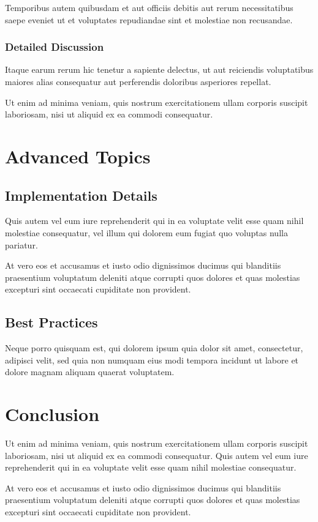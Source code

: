\documentclass[11pt,twoside,openright]{book}
\begin{document}
Temporibus autem quibusdam et aut officiis debitis aut rerum necessitatibus saepe eveniet ut et voluptates repudiandae sint et molestiae non recusandae.

\subsection{Detailed Discussion}

Itaque earum rerum hic tenetur a sapiente delectus, ut aut reiciendis voluptatibus maiores alias consequatur aut perferendis doloribus asperiores repellat.

Ut enim ad minima veniam, quis nostrum exercitationem ullam corporis suscipit laboriosam, nisi ut aliquid ex ea commodi consequatur.

\chapter{Advanced Topics}

\section{Implementation Details}

Quis autem vel eum iure reprehenderit qui in ea voluptate velit esse quam nihil molestiae consequatur, vel illum qui dolorem eum fugiat quo voluptas nulla pariatur.

At vero eos et accusamus et iusto odio dignissimos ducimus qui blanditiis praesentium voluptatum deleniti atque corrupti quos dolores et quas molestias excepturi sint occaecati cupiditate non provident.

\section{Best Practices}

Neque porro quisquam est, qui dolorem ipsum quia dolor sit amet, consectetur, adipisci velit, sed quia non numquam eius modi tempora incidunt ut labore et dolore magnam aliquam quaerat voluptatem.

\chapter{Conclusion}

Ut enim ad minima veniam, quis nostrum exercitationem ullam corporis suscipit laboriosam, nisi ut aliquid ex ea commodi consequatur. Quis autem vel eum iure reprehenderit qui in ea voluptate velit esse quam nihil molestiae consequatur.

At vero eos et accusamus et iusto odio dignissimos ducimus qui blanditiis praesentium voluptatum deleniti atque corrupti quos dolores et quas molestias excepturi sint occaecati cupiditate non provident.


% 
% 

\end{document}
